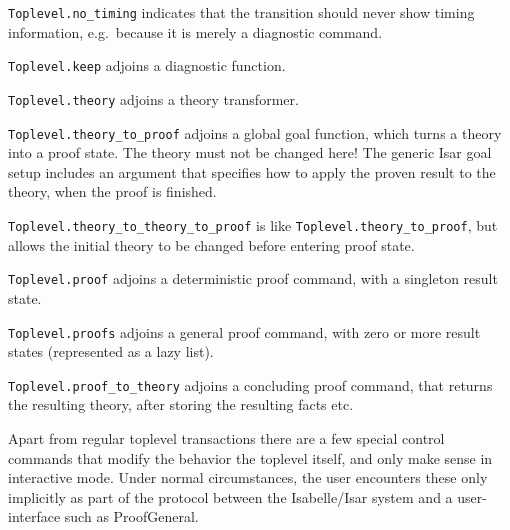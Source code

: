 \begin{isabellebody}
\begin{isamarkuptext}
\begin{description}
  \item \verb|Toplevel.no_timing| indicates that the transition should
  never show timing information, e.g.\ because it is merely a
  diagnostic command.

  \item \verb|Toplevel.keep| adjoins a diagnostic function.

  \item \verb|Toplevel.theory| adjoins a theory transformer.

  \item \verb|Toplevel.theory_to_proof| adjoins a global goal function,
  which turns a theory into a proof state.  The theory must not be
  changed here!  The generic Isar goal setup includes an argument that
  specifies how to apply the proven result to the theory, when the
  proof is finished.

  \item \verb|Toplevel.theory_to_theory_to_proof| is like \verb|Toplevel.theory_to_proof|, but allows the initial theory to be
  changed before entering proof state.

  \item \verb|Toplevel.proof| adjoins a deterministic proof command,
  with a singleton result state.

  \item \verb|Toplevel.proofs| adjoins a general proof command, with
  zero or more result states (represented as a lazy list).

  \item \verb|Toplevel.proof_to_theory| adjoins a concluding proof
  command, that returns the resulting theory, after storing the
  resulting facts etc.

  \end{description}%
\end{isamarkuptext}%
\isamarkuptrue%
%
\endisatagmlref
{\isafoldmlref}%
%
\isadelimmlref
%
\endisadelimmlref
%
\isamarkuptrue%
%
\begin{isamarkuptext}%
Apart from regular toplevel transactions there are a few
  special control commands that modify the behavior the toplevel
  itself, and only make sense in interactive mode.  Under normal
  circumstances, the user encounters these only implicitly as part of
  the protocol between the Isabelle/Isar system and a user-interface
  such as ProofGeneral.

  \begin{description}


\end{description}
\end{isamarkuptext}
\end{isabellebody}
